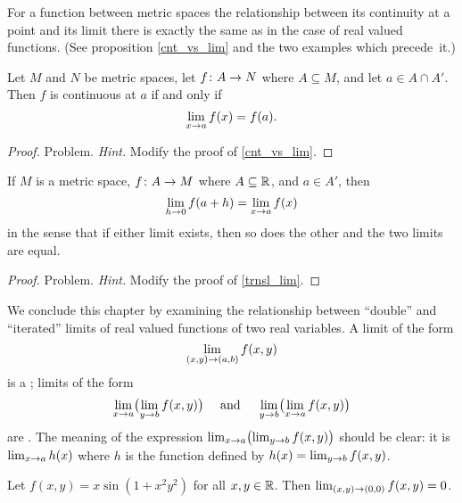 For a function between metric spaces the relationship between its continuity at a point and its
limit there is exactly the same as in the case of real valued functions.  (See proposition
\ref{cnt_vs_lim} and the two examples which precede~it.)

\begin{prop}\label{cont_vs_lim} Let $M$ and $N$ be metric spaces, let $f\colon A \rightarrow N$ where
$A \subseteq M$, and let $a \in A \cap A'$. Then $f$ is continuous at $a$ if and only if
   \[\lim_{x \rightarrow a}f(x) = f(a).\]
\end{prop}

\begin{proof} Problem.  \emph{Hint.}  Modify the proof of \ref{cnt_vs_lim}.  \ns
\end{proof}

\begin{prop}\label{lim_changvar_R} If $M$ is a metric space, $f\colon A \rightarrow M$ where $A \subseteq \mathbb{R}$,
and $a \in A'$, then
   \[ \lim_{h \rightarrow 0}f(a + h) = \lim_{x \rightarrow a}f(x) \]
in the sense that if either limit exists, then so does the other and the two limits are equal.
\end{prop}

\begin{proof} Problem.  \emph{Hint.}  Modify the proof of \ref{trnsl_lim}.  \ns
\end{proof}

We conclude this chapter by examining the relationship between ``double'' and ``iterated'' limits
of real valued functions of two real variables.  A limit of the form
  \[ \lim_{(x,y) \rightarrow (a,b)}f(x,y) \]
is a
; limits of the form
   \[\lim_{x \rightarrow a}\bigl(\lim_{y \rightarrow b}f(x, y)\bigr) \quad
         \text{ and } \quad \lim_{y \rightarrow b}
         \bigl(\lim_{x \rightarrow a}f(x,y)\bigr)\]
are
.  The meaning of the expression $\lim_{x \rightarrow a}\bigl(\lim_{y \rightarrow b}
f(x,y)\bigr)$ should be clear: it is $\lim_{x \rightarrow a}h(x)$ where $h$ is the function defined by
$h(x) = \lim_{y \rightarrow b}f(x,y)$.

\begin{exam} Let $f(x,y) = x\sin(1 + x^2y^2)$ for all $x,y \in \mathbb{R}$.  Then
$\lim_{(x,y)\rightarrow(0,0)}f(x,y) = 0$.
\end{exam}

